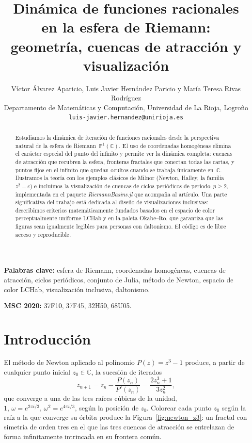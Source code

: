 \documentclass[11pt,a4paper]{article}
\title{\textbf{Dinámica de funciones racionales en la esfera de Riemann:
       geometría, cuencas de atracción y visualización}}
\author{Víctor Álvarez Aparicio,
        Luis Javier Hernández Paricio
        y María Teresa Rivas Rodríguez\\
        {\small Departamento de Matemáticas y Computación,
        Universidad de La Rioja, Logroño}\\
        {\small \texttt{luis-javier.hernandez@unirioja.es}}}
\date{} %
\theoremstyle{plain}
\theoremstyle{definition}
\theoremstyle{remark}
\newcommand{\C}{\mathbb{C}}
\newcommand{\Puno}{\mathbb{P}^1(\mathbb{C})}
\newcommand{\pkg}[1]{\textsl{#1}}
\begin{document}

\maketitle

\begin{abstract}
Estudiamos la dinámica de iteración de funciones racionales desde la
perspectiva natural de la esfera de Riemann~$\Puno$.
El uso de coordenadas homogéneas elimina el carácter especial del punto
del infinito y permite ver la dinámica completa: cuencas de atracción
que recubren la esfera, fronteras fractales que conectan todas las
cartas, y puntos fijos en el infinito que quedan ocultos cuando se
trabaja únicamente en~$\C$.
Ilustramos la teoría con los ejemplos clásicos de Milnor (Newton,
Halley, la familia $z^2+c$) e incluimos la visualización de cuencas
de ciclos periódicos de período~$p\geq 2$, implementada en el paquete
\pkg{RiemannBasins.jl} que acompaña al artículo.
Una parte significativa del trabajo está dedicada al diseño de
visualizaciones inclusivas: describimos criterios matemáticamente
fundados basados en el espacio de color perceptualmente uniforme LCHab
y en la paleta Okabe--Ito, que garantiza que las figuras sean
igualmente legibles para personas con daltonismo.
El código es de libre acceso y reproducible.
\end{abstract}

\bigskip
\noindent\textbf{Palabras clave:} esfera de Riemann, coordenadas homogéneas,
cuencas de atracción, ciclos periódicos, conjunto de Julia, método de Newton,
espacio de color LCHab, visualización inclusiva, daltonismo.

\medskip
\noindent\textbf{MSC 2020:} 37F10, 37F45, 32H50, 68U05.

\section{Introducción}

El método de Newton aplicado al polinomio $P(z)=z^3-1$ produce, a partir
de cualquier punto inicial $z_0\in\C$, la sucesión de iterados
\[
   z_{n+1} = z_n - \frac{P(z_n)}{P'(z_n)}
           = \frac{2z_n^3+1}{3z_n^2},
\]
que converge a una de las tres raíces cúbicas de la unidad,
$1,\,\omega=e^{2\pi i/3},\,\omega^2=e^{4\pi i/3}$, según la posición de
$z_0$.
Colorear cada punto $z_0$ según la raíz a la que converge su órbita
produce la Figura~\ref{fig:newton_z3}: un fractal con simetría de orden
tres en el que las tres cuencas de atracción se entrelazan de forma
infinitamente intrincada en su frontera común.
\end{document}
